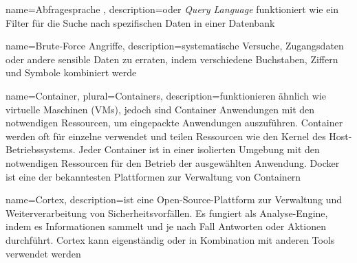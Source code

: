  {
    name={Abfragesprache },
    description={oder \textit{Query Language} funktioniert wie ein Filter für die Suche nach spezifischen Daten in einer Datenbank \citep{at_query}}}




 {
    name={Brute-Force Angriffe},
    description={systematische Versuche, Zugangsdaten oder andere sensible Daten zu erraten, indem verschiedene Buchstaben, Ziffern und Symbole kombiniert werde \citep{Sowmya_BruteForce}}}


 {
    name={Container},
    plural={Containers},
    description={funktionieren ähnlich wie virtuelle Maschinen (VMs), jedoch sind Container Anwendungen mit den notwendigen Ressourcen, um eingepackte Anwendungen auszuführen. Container werden oft für einzelne verwendet und teilen Ressourcen wie den Kernel des Host-Betriebssystems. Jeder Container ist in einer isolierten Umgebung mit den notwendigen Ressourcen für den Betrieb der ausgewählten Anwendung. Docker ist eine der bekanntesten Plattformen zur Verwaltung von Containern \citep{Douglis_Container}}}

 {
    name={Cortex},
    description={ist eine Open-Source-Plattform zur Verwaltung und Weiterverarbeitung von Sicherheitsvorfällen. Es fungiert als Analyse-Engine, indem es Informationen sammelt und je nach Fall Antworten oder Aktionen durchführt. Cortex kann eigenständig oder in Kombination mit anderen Tools verwendet werden \citep{TheHive}}   
}

